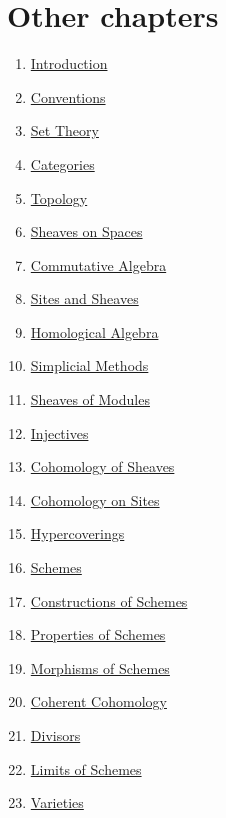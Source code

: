 \section{Other chapters}

\begin{multicols}{2}
\begin{enumerate}
\item \hyperref[introduction-section-phantom]{Introduction}
\item \hyperref[conventions-section-phantom]{Conventions}
\item \hyperref[sets-section-phantom]{Set Theory}
\item \hyperref[categories-section-phantom]{Categories}
\item \hyperref[topology-section-phantom]{Topology}
\item \hyperref[sheaves-section-phantom]{Sheaves on Spaces}
\item \hyperref[algebra-section-phantom]{Commutative Algebra}
\item \hyperref[sites-section-phantom]{Sites and Sheaves}
\item \hyperref[homology-section-phantom]{Homological Algebra}
\item \hyperref[simplicial-section-phantom]{Simplicial Methods}
\item \hyperref[modules-section-phantom]{Sheaves of Modules}
\item \hyperref[injectives-section-phantom]{Injectives}
\item \hyperref[cohomology-section-phantom]{Cohomology of Sheaves}
\item \hyperref[sites-cohomology-section-phantom]{Cohomology on Sites}
\item \hyperref[hypercovering-section-phantom]{Hypercoverings}
\item \hyperref[schemes-section-phantom]{Schemes}
\item \hyperref[constructions-section-phantom]{Constructions of Schemes}
\item \hyperref[properties-section-phantom]{Properties of Schemes}
\item \hyperref[morphisms-section-phantom]{Morphisms of Schemes}
\item \hyperref[coherent-section-phantom]{Coherent Cohomology}
\item \hyperref[divisors-section-phantom]{Divisors}
\item \hyperref[limits-section-phantom]{Limits of Schemes}
\item \hyperref[varieties-section-phantom]{Varieties}

\end{enumerate}
\end{multicols}
